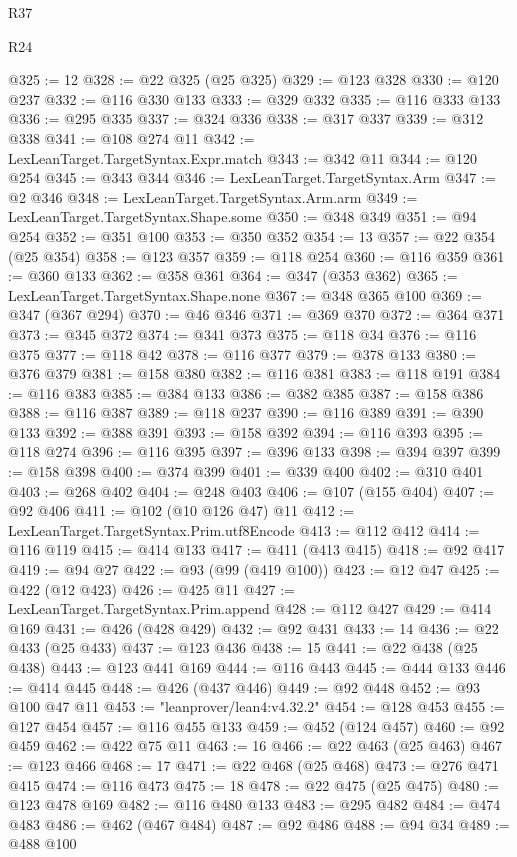 \begin{lexlean}{R37}
\begin{lexlean}{R24}
\begin{coremodule}
{{{{{{{{{{{{{{{{{{{{{{{{{{{{{{{{{{{{{{{{{{{{{{{{{{{{{{{{{{{{{{{{{{{{{{{{{{{{{{{{{{{{{{{{{{{{{{{{{{{{{{{{{{{{{{{{{{{{{{{{{{{{{{{{{{{{{{{{{{{{{{{{{{{{{{{{{{{{{{{{{{{{{{{{{{{{{{{{{{{{{{{{{@325 := 12
@328 := @22 @325 (@25 @325)
@329 := @123 @328
@330 := @120 @237
@332 := @116 @330 @133
@333 := @329 @332
@335 := @116 @333 @133
@336 := @295 @335
@337 := @324 @336
@338 := @317 @337
@339 := @312 @338
@341 := @108 @274 @11
@342 := LexLeanTarget.TargetSyntax.Expr.match
@343 := @342 @11
@344 := @120 @254
@345 := @343 @344
@346 := LexLeanTarget.TargetSyntax.Arm
@347 := @2 @346
@348 := LexLeanTarget.TargetSyntax.Arm.arm
@349 := LexLeanTarget.TargetSyntax.Shape.some
@350 := @348 @349
@351 := @94 @254
@352 := @351 @100
@353 := @350 @352
@354 := 13
@357 := @22 @354 (@25 @354)
@358 := @123 @357
@359 := @118 @254
@360 := @116 @359
@361 := @360 @133
@362 := @358 @361
@364 := @347 (@353 @362)
@365 := LexLeanTarget.TargetSyntax.Shape.none
@367 := @348 @365 @100
@369 := @347 (@367 @294)
@370 := @46 @346
@371 := @369 @370
@372 := @364 @371
@373 := @345 @372
@374 := @341 @373
@375 := @118 @34
@376 := @116 @375
@377 := @118 @42
@378 := @116 @377
@379 := @378 @133
@380 := @376 @379
@381 := @158 @380
@382 := @116 @381
@383 := @118 @191
@384 := @116 @383
@385 := @384 @133
@386 := @382 @385
@387 := @158 @386
@388 := @116 @387
@389 := @118 @237
@390 := @116 @389
@391 := @390 @133
@392 := @388 @391
@393 := @158 @392
@394 := @116 @393
@395 := @118 @274
@396 := @116 @395
@397 := @396 @133
@398 := @394 @397
@399 := @158 @398
@400 := @374 @399
@401 := @339 @400
@402 := @310 @401
@403 := @268 @402
@404 := @248 @403
@406 := @107 (@155 @404)
@407 := @92 @406
@411 := @102 (@10 @126 @47) @11
@412 := LexLeanTarget.TargetSyntax.Prim.utf8Encode
@413 := @112 @412
@414 := @116 @119
@415 := @414 @133
@417 := @411 (@413 @415)
@418 := @92 @417
@419 := @94 @27
@422 := @93 (@99 (@419 @100))
@423 := @12 @47
@425 := @422 (@12 @423)
@426 := @425 @11
@427 := LexLeanTarget.TargetSyntax.Prim.append
@428 := @112 @427
@429 := @414 @169
@431 := @426 (@428 @429)
@432 := @92 @431
@433 := 14
@436 := @22 @433 (@25 @433)
@437 := @123 @436
@438 := 15
@441 := @22 @438 (@25 @438)
@443 := @123 @441 @169
@444 := @116 @443
@445 := @444 @133
@446 := @414 @445
@448 := @426 (@437 @446)
@449 := @92 @448
@452 := @93 @100 @47 @11
@453 := "leanprover/lean4:v4.32.2"
@454 := @128 @453
@455 := @127 @454
@457 := @116 @455 @133
@459 := @452 (@124 @457)
@460 := @92 @459
@462 := @422 @75 @11
@463 := 16
@466 := @22 @463 (@25 @463)
@467 := @123 @466
@468 := 17
@471 := @22 @468 (@25 @468)
@473 := @276 @471 @415
@474 := @116 @473
@475 := 18
@478 := @22 @475 (@25 @475)
@480 := @123 @478 @169
@482 := @116 @480 @133
@483 := @295 @482
@484 := @474 @483
@486 := @462 (@467 @484)
@487 := @92 @486
@488 := @94 @34
@489 := @488 @100
}}}}}}}}}}}}}}}}}}}}}}}}}}}}}}}}}}}}}}}}}}}}}}}}}}}}}}}}}}}}}}}}}}}}}}}}}}}}}}}}}}}}}}}}}}}}}}}}}}}}}}}}}}}}}}}}}}}}}}}}}}}}}}}}}}}}}}}}}}}}}}}}}}}}}}}}}}}}}}}}}}}}}}}}}}}}}}}}}}}}}}}}}
\end{coremodule}
\end{lexlean}
\end{lexlean}
